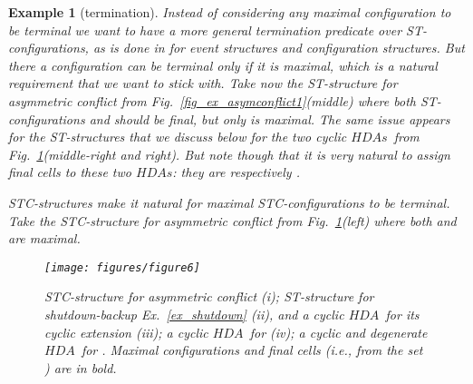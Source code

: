\documentclass[submission,copyright,creativecommons]{eptcs}
\newtheorem{example}[theorem]{Example}
\newcommand\HDA{\ensuremath{\mathit{HDA}}}
\newcommand\HDAs{\ensuremath{\mathit{HDAs}}}
\begin{document}
\begin{example}[termination]\label{ex_termination}
Instead of considering any maximal configuration to be terminal we want to have a more general \textit{termination predicate} over ST-configurations, as is done in \cite[Def.4.1\&Def.5.1]{GlabbeekG01refinement} for event structures and configuration structures. But there a configuration can be terminal only if it is maximal, which is a natural requirement that we want to stick with.
Take now the ST-structure for asymmetric conflict from Fig.~\ref{fig_ex_asymconflict1}(middle) where both ST-configurations  and  should be final, but only  is maximal. The same issue appears for the ST-structures that we discuss below for the two cyclic \HDAs\ from Fig.~\ref{fig_ex_STC_structs}(middle-right and right). But note though that it is very natural to assign \textit{final cells} to these two \HDAs: they are  respectively .

STC-structures make it natural for maximal STC-configurations to be terminal. Take the STC-structure for asymmetric conflict from Fig.~\ref{fig_ex_STC_structs}(left) where both  and  are maximal.
\begin{figure}[tp]
  \begin{center}
    \texttt{[image: figures/figure6]}
  \end{center}
\caption{STC-structure for \textit{asymmetric conflict}  (i); ST-structure for shutdown-backup Ex.~\ref{ex_shutdown} (ii), and a cyclic \HDA\ for its cyclic extension (iii); a cyclic \HDA\ for  (iv); a cyclic and degenerate \HDA\ for . Maximal configurations and final cells (i.e., from the set ) are in bold.}
\label{fig_ex_STC_structs}
\end{figure}
\end{example}
\end{document}
